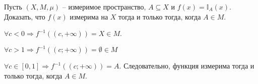 \begin{task}{2}
Пусть $(X, M, \mu)$ -- измеримое пространство, $A \subseteq X$ и $f(x) = \mathbb{I}_A(x)$. Доказать, что $f(x)$ измерима на $X$ тогда и только тогда, когда $A \in M$.
\end{task}
\begin{solution}

$\forall c < 0 \Rightarrow f^{-1}((c, +\infty)) = X \in M$.

$\forall c > 1 \Rightarrow f^{-1}((c; +\infty)) = \emptyset \in M$

$\forall c \in [0, 1] \Rightarrow f^{-1}((c;+\infty)) = A. $ Следовательно, функция измерима тогда и только тогда, когда $A \in M$.
\end{solution}